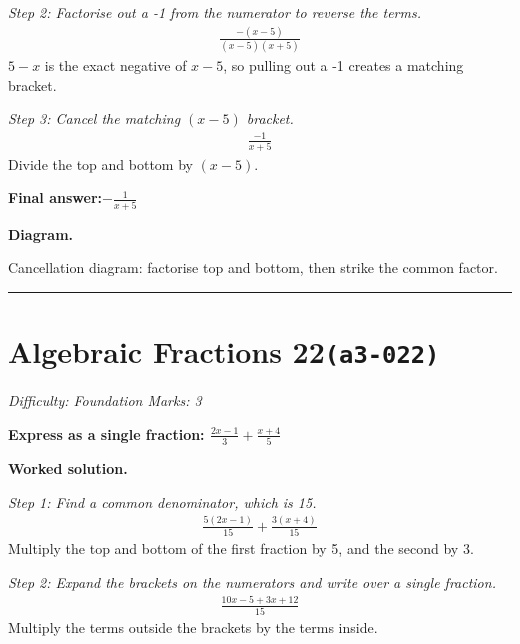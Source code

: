 \documentclass[11pt]{article}
\newcommand{\question}[1]{\par\medskip\noindent\textbf{#1}\par}
\begin{document}
\textit{Step 2: Factorise out a -1 from the numerator to reverse the terms.}
\[\begin{gathered}
\frac{-(x - 5)}{(x - 5)(x + 5)}
\end{gathered}\]
\( 5 - x \) is the exact negative of \( x - 5 \), so pulling out a -1 creates a matching bracket.

\textit{Step 3: Cancel the matching \( (x - 5) \) bracket.}
\[\begin{gathered}
\frac{-1}{x + 5}
\end{gathered}\]
Divide the top and bottom by \( (x - 5) \).

\begin{answerbox}
\textbf{Final answer:}\quad \(\displaystyle -\frac{1}{x + 5}\)
\end{answerbox}
\textbf{Diagram.}

\begin{center}
\end{center}
\small Cancellation diagram: factorise top and bottom, then strike the common factor.\normalsize

\medskip\hrule

\section*{Algebraic Fractions 22\quad\small\texttt{(a3-022)}}
\textit{Difficulty: Foundation \quad\textbar\quad Marks: 3}

\question{Express as a single fraction: \( \frac{2x - 1}{3} + \frac{x + 4}{5} \)}

\textbf{Worked solution.}

\textit{Step 1: Find a common denominator, which is 15.}
\[\begin{gathered}
\frac{5(2x - 1)}{15} + \frac{3(x + 4)}{15}
\end{gathered}\]
Multiply the top and bottom of the first fraction by 5, and the second by 3.

\textit{Step 2: Expand the brackets on the numerators and write over a single fraction.}
\[\begin{gathered}
\frac{10x - 5 + 3x + 12}{15}
\end{gathered}\]
Multiply the terms outside the brackets by the terms inside.
\end{document}
